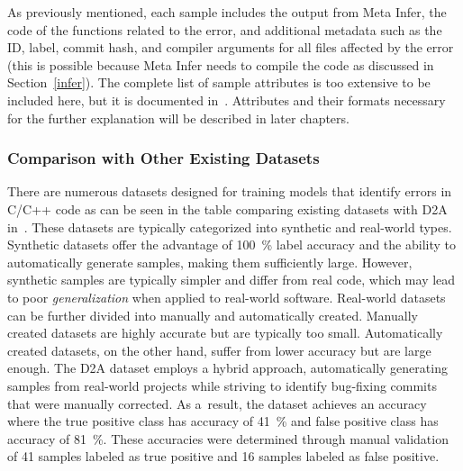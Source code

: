 As previously mentioned, each sample includes the output from Meta Infer, the code of the functions related to the error, and additional metadata such as the ID, label, commit hash, and compiler arguments for all files affected by the error (this is possible because Meta Infer needs to compile the code as discussed in Section~\ref{infer}). The complete list of sample attributes is too extensive to be included here, but it is documented in~\cite{d2a-sample-description}. Attributes and their formats necessary for the further explanation will be described in later chapters.

\subsubsection{Comparison with Other Existing Datasets}
There are numerous datasets designed for training models that identify errors in C/C++ code as can be seen in the table comparing existing datasets with D2A in~\cite{D2A-zheng2021d2a}. These datasets are typically categorized into synthetic and real-world types. Synthetic datasets offer the advantage of 100~\% label accuracy and the ability to automatically generate samples, making them sufficiently large. However, synthetic samples are typically simpler and differ from real code, which may lead to poor \textit{generalization} when applied to real-world software. Real-world datasets can be further divided into manually and automatically created. Manually created datasets are highly accurate but are typically too small. Automatically created datasets, on the other hand, suffer from lower accuracy but are large enough. The D2A dataset employs a hybrid approach, automatically generating samples from real-world projects while striving to identify bug-fixing commits that were manually corrected. As a~result, the dataset achieves an accuracy where the true positive class has accuracy of 41~\% and false positive class has accuracy of 81~\%. These accuracies were determined through manual validation of 41 samples labeled as true positive and 16 samples labeled as false positive.

